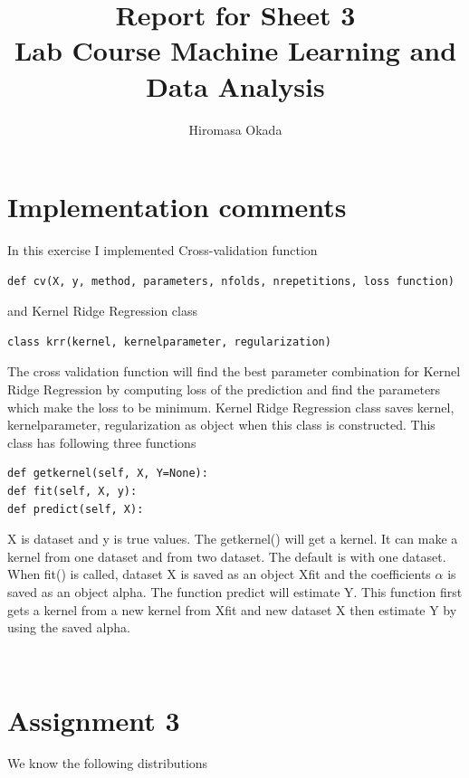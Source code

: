 \documentclass[a4paper,11pt]{article}
\begin{document}
\author{Hiromasa Okada}
\title{\vspace{-2cm}Report for Sheet 3\\
\small{Lab Course Machine Learning and Data Analysis}}
\maketitle

\section*{Implementation comments}
In this exercise I implemented Cross-validation function 

\begin{verbatim}
def cv(X, y, method, parameters, nfolds, nrepetitions, loss function)
\end{verbatim}
and Kernel Ridge Regression class 

\begin{verbatim}
class krr(kernel, kernelparameter, regularization)
\end{verbatim}

The cross validation function will find the best parameter combination for Kernel Ridge Regression by computing loss of the prediction and find the parameters which make the loss to be minimum. 
Kernel Ridge Regression class saves kernel, kernelparameter, regularization as object when this class is constructed. This class has following three functions 

\begin{verbatim}
def getkernel(self, X, Y=None):
def fit(self, X, y):
def predict(self, X):
\end{verbatim}
 
X is dataset and y is true values. The getkernel() will get a kernel. It can make a kernel from one dataset and from two dataset. The default is with one dataset. When fit() is called, dataset X is saved as an object Xfit and the coefficients $\alpha$ is saved as an object alpha. The function predict will estimate Y. This function first gets a kernel from a new kernel from Xfit and new dataset X then estimate Y by using the saved alpha.

\begin{verbatim}


\end{verbatim}


\section*{Assignment 3}
We know the following distributions
\end{document}
